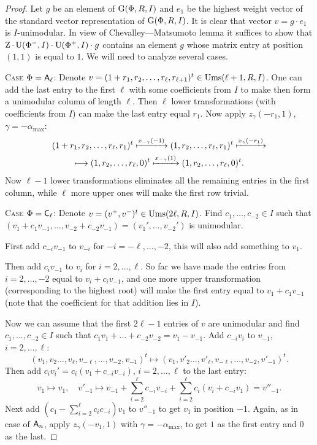 \begin{proof}
Let $g$ be an element of $\operatorname{G}(\Phi, R, I)$ and $e_1$ be the highest weight vector of the standard vector representation of $\operatorname{G}(\Phi, R, I)$.
It is clear that vector $v=g\cdot e_1$ is $I$-unimodular.
In view of Chevalley---Matsumoto lemma it suffices to show that $\operatorname{Z} \cdot \operatorname{U}(\Phi^-, I) \cdot \operatorname{U}(\Phi^+, I) \cdot g$ contains an element $g$ whose matrix entry at position $(1,1)$ is equal to $1$.
We will need to analyze several cases.

\textsc{Case $\Phi=\mathsf{A}_\ell$:}
Denote $v=(1+r_1,r_2,\ldots,r_\ell,r_{\ell+1})^t\in\operatorname{Ums}(\ell+1,R,I)$.
One can add the last entry to the first $\ell$ with some coefficients from $I$ to make then form a unimodular column of length $\ell$.
Then $\ell$ lower transformations (with coefficients from $I$) can make the last entry equal $r_1$.
Now apply $z_\gamma(-r_1,1)$, $\gamma=-\alpha_{\max}$:
\begin{multline*}
(1+r_1,r_2,\ldots,r_\ell,r_1)^t\xmapsto{x_{-\gamma}(-1)}(1,r_2,\ldots,r_\ell,r_1)^t\xmapsto{x_\gamma(-r_1)}\\\longmapsto(1,r_2,\ldots,r_\ell,0)^t\xmapsto{x_{-\gamma}(1)}(1,r_2,\ldots,r_\ell,0)^t.
\end{multline*}
Now $\ell-1$ lower transformations eliminates all the remaining entries in the first column, while $\ell$ more upper ones will make the first row trivial.

\textsc{Case $\Phi=\mathsf{C}_\ell$:}
Denote $v=(v^+,v^-)^t\in\operatorname{Ums}(2\ell,R,I)$. Find $c_1,\ldots,c_{-2}\in I$ such that $(v_1+c_1v_{-1},\ldots,v_{-2}+c_{-2}v_{-1})=(v_1',\ldots,v_{-2}')$ is unimodular.

First add $c_{-i}v_{-1}$ to $v_{-i}$ for $-i=-\ell,\ldots,-2$, this will also add something to $v_1$.

Then add $c_iv_{-1}$ to $v_i$ for $i=2,\ldots,\ell$. So far we have made the entries from $i=2,\ldots,-2$ equal to $v_i+c_iv_{-1}$, and one more upper transformation (corresponding to the highest root) will make the first entry equal to $v_1+c_1v_{-1}$ (note that the coefficient for that addition lies in $I$).

Now we can assume that the first $2\ell-1$ entries of $v$ are unimodular and find $c_1,\ldots,c_{-2}\in I$ such that $c_1v_1+\ldots+c_{-2}v_{-2}=v_1-v_{-1}$. Add $c_{-i}v_i$ to $v_{-1}$, $i=2,\ldots,\ell$:
\[ (v_1,v_2\ldots,v_\ell,v_{-\ell},\ldots,v_{-2},v_{-1})^t\longmapsto (v_1,v'_2\ldots,v'_\ell,v_{-\ell},\ldots,v_{-2},v'_{-1})^t. \]
Then add $c_iv_i'=c_i(v_1+c_{-i}v_{-i})$, $i=2,\ldots,\ell$ to the last entry:
\[ v_1\longmapsto v_1,\quad v'_{-1}\longmapsto v_{-1}+\sum_{i=2}^\ell c_{-i}v_{-i}+\sum_{i=2}^\ell c_i(v_i+c_{-i}v_1)=v''_{-1}. \]
Next add $\left(c_1-\sum_{i=2}^\ell c_ic_{-i}\right)v_1$ to $v''_{-1}$ to get $v_1$ in position $-1$. Again, as in case of $\mathsf{A}_n$, apply $z_\gamma(-v_1,1)$ with $\gamma=-\alpha_\mathrm{max}$, to get $1$ as the first entry and $0$ as the last.


\end{proof}
